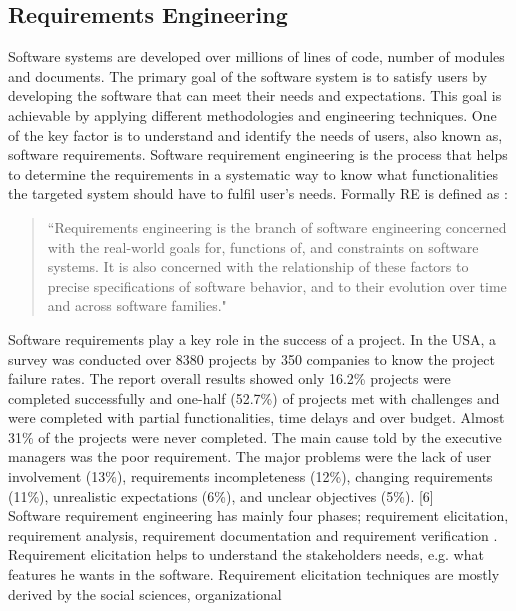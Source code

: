 \subsection{Requirements Engineering}

Software systems are developed over millions of lines of code, number of modules and
documents. The primary goal of the software system is to satisfy users by developing the
software that can meet their needs and expectations. This goal is achievable by applying
different methodologies and engineering techniques. One of the key factor is to understand and
identify the needs of users, also known as, software requirements. Software requirement
engineering is the process that helps to determine the requirements in a systematic way to know
what functionalities the targeted system should have to fulfil user's needs. Formally RE is
defined as \cite{Zave:1997:CRE:267580.267581}:\\
\begin{quote}
``Requirements engineering is the branch of software engineering concerned with the real-world
goals for, functions of, and constraints on software systems. It is also concerned with the
relationship of these factors to precise specifications of software behavior, and to their evolution
over time and across software families."
\end{quote}
Software requirements play a key role in the success of a project. In the USA, a survey was
conducted over 8380 projects by 350 companies to know the project failure rates. The report
overall results showed only 16.2\% projects were completed successfully and one-half (52.7\%)
of projects met with challenges and were completed with partial functionalities, time delays and
over budget. Almost 31\% of the projects were never completed. The main cause told by the
executive managers was the poor requirement. The major problems were the lack of user
involvement (13\%), requirements incompleteness (12\%), changing requirements (11\%),
unrealistic expectations (6\%), and unclear objectives (5\%).\cite{knuthwebsite} [6]\\
Software requirement engineering has mainly four phases; requirement elicitation, requirement
analysis, requirement documentation and requirement verification \cite {Kotonya:1998:REP:552009}. Requirement elicitation
\cite{Coughlan:2002:ECR:2740304.2740444,Zowghi2005} helps to understand the stakeholders needs, e.g. what features he wants in the software.
Requirement elicitation techniques are mostly derived by the social sciences, organizational
